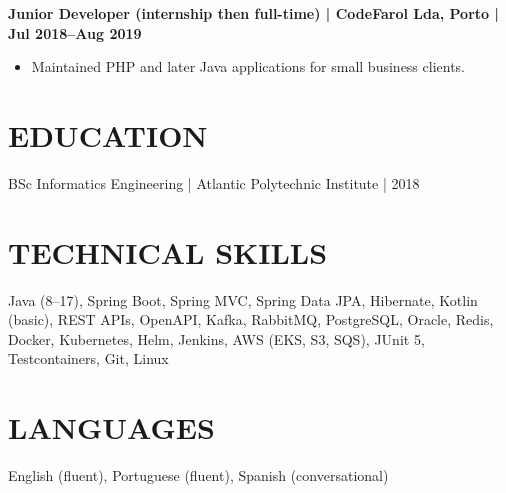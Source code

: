 \documentclass[11pt,a4paper]{article}
\begin{document}
\textbf{Junior Developer (internship then full-time) | CodeFarol Lda, Porto | Jul 2018--Aug 2019}
\begin{itemize}
\item Maintained PHP and later Java applications for small business clients.
\end{itemize}

\section*{EDUCATION}
BSc Informatics Engineering | Atlantic Polytechnic Institute | 2018

\section*{TECHNICAL SKILLS}
Java (8--17), Spring Boot, Spring MVC, Spring Data JPA, Hibernate, Kotlin (basic), REST APIs, OpenAPI, Kafka, RabbitMQ, PostgreSQL, Oracle, Redis, Docker, Kubernetes, Helm, Jenkins, AWS (EKS, S3, SQS), JUnit 5, Testcontainers, Git, Linux

\section*{LANGUAGES}
English (fluent), Portuguese (fluent), Spanish (conversational)
\end{document}
